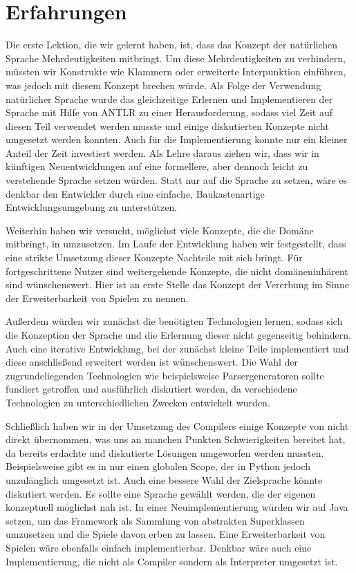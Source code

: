 
\chapter{Erfahrungen}
\label{cha:erfahrungen}
	Die erste Lektion, die wir gelernt haben, ist, dass das Konzept der natürlichen Sprache Mehrdeutigkeiten mitbringt. Um diese Mehrdeutigkeiten zu verhindern, müssten wir Konstrukte wie Klammern oder erweiterte Interpunktion einführen, was jedoch mit diesem Konzept brechen würde. Als Folge der Verwendung natürlicher Sprache wurde das gleichzeitige Erlernen und Implementieren der Sprache mit Hilfe von ANTLR zu einer Herausforderung, sodass viel Zeit auf diesen Teil verwendet werden musste und einige diskutierten Konzepte nicht umgesetzt werden konnten. Auch für die Implementierung konnte nur ein kleiner Anteil der Zeit investiert werden. Als Lehre daraus ziehen wir, dass wir in künftigen Neuentwicklungen auf eine formellere, aber dennoch leicht zu verstehende Sprache setzen würden. Statt nur auf die Sprache zu setzen, wäre es denkbar den Entwickler durch eine einfache, Baukastenartige Entwicklungsumgebung zu unterstützen.

	Weiterhin haben wir versucht, möglichst viele Konzepte, die die Domäne mitbringt, in \dg umzusetzen. Im Laufe der Entwicklung haben wir festgestellt, dass eine strikte Umsetzung dieser Konzepte Nachteile mit sich bringt. Für fortgeschrittene Nutzer sind weitergehende Konzepte, die nicht domäneninhärent sind wünschenswert. Hier ist an erste Stelle das Konzept der Vererbung im Sinne der Erweiterbarkeit von Spielen zu nennen.

	Außerdem würden wir zunächst die benötigten Technologien lernen, sodass sich die Konzeption der Sprache und die Erlernung dieser nicht gegenseitig behindern. Auch eine iterative Entwicklung, bei der zunächst kleine Teile implementiert und diese anschließend erweitert werden ist wünschenswert. Die Wahl der zugrundeliegenden Technologien wie beispielsweise Parsergeneratoren sollte fundiert getroffen und ausführlich diskutiert werden, da verschiedene Technologien zu unterschiedlichen Zwecken entwickelt wurden.

	Schließlich haben wir in der Umsetzung des Compilers einige Konzepte von \dg nicht direkt übernommen, was uns an manchen Punkten Schwierigkeiten bereitet hat, da bereits erdachte und diskutierte Lösungen umgeworfen werden mussten. Beispielsweise gibt es in \dg nur einen globalen Scope, der in Python jedoch unzulänglich umgesetzt ist. Auch eine bessere Wahl der Zielsprache könnte diskutiert werden. Es sollte eine Sprache gewählt werden, die der eigenen konzeptuell möglichst nah ist. In einer Neuimplementierung würden wir auf Java setzen, um das Framework als Sammlung von abstrakten Superklassen umzusetzen und die Spiele davon erben zu lassen. Eine Erweiterbarkeit von Spielen wäre ebenfalls einfach implementierbar. Denkbar wäre auch eine Implementierung, die nicht als Compiler sondern als Interpreter umgesetzt ist.

\newpage